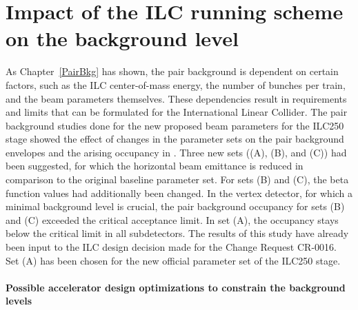 \section{Impact of the ILC running scheme on the background level}

As Chapter~\ref{PairBkg} has shown, the pair background is dependent on certain factors, such as the ILC center-of-mass energy, the number of bunches per train, and the beam parameters themselves.
These dependencies result in requirements and limits that can be formulated for the International Linear Collider.
The pair background studies done for the new proposed beam parameters for the ILC250 stage showed the effect of changes in the parameter sets on the pair background envelopes and the arising occupancy in \sid.
Three new sets ((A), (B), and (C)) had been suggested, for which the horizontal beam emittance is reduced in comparison to the original baseline parameter set.
For sets (B) and (C), the beta function values had additionally been changed.
In the \sid vertex detector, for which a minimal background level is crucial, the pair background occupancy for sets (B) and (C) exceeded the critical acceptance limit.
In set (A), the occupancy stays below the critical limit in all \sid subdetectors.
The results of this study have already been input to the ILC design decision made for the Change Request CR-0016.
Set (A) has been chosen for the new official parameter set of the ILC250 stage.

\paragraph{Possible accelerator design optimizations to constrain the background levels}

